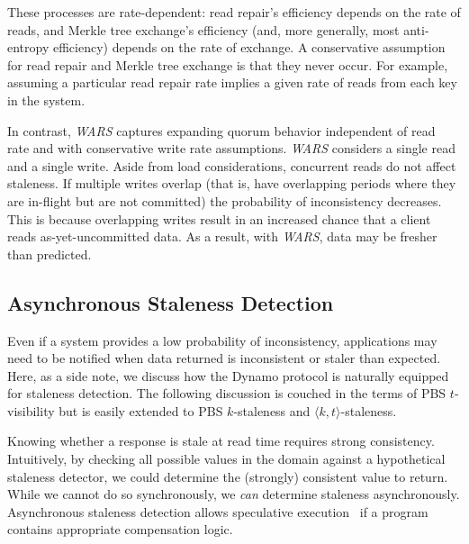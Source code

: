 \documentclass{vldb}
\newcommand{\subsectionskip}{-0em}
\begin{document}
These processes are rate-dependent: read repair's efficiency depends
on the rate of reads, and Merkle tree exchange's efficiency (and, more
generally, most anti-entropy efficiency) depends on the rate of
exchange.  A conservative assumption for read repair and Merkle tree
exchange is that they never occur. For example, assuming a particular
read repair rate implies a given rate of reads from each key in the
system.

In contrast, \textit{WARS} captures expanding quorum behavior
independent of read rate and with conservative write rate
assumptions. \textit{WARS} considers a single read and a single
write. Aside from load considerations, concurrent reads do not affect
staleness. If multiple writes overlap (that is, have overlapping
periods where they are in-flight but are not committed) the
probability of inconsistency decreases.  This is because overlapping
writes result in an increased chance that a client reads
as-yet-uncommitted data.  As a result, with \textit{WARS}, data may be
fresher than predicted.

\vspace{\subsectionskip}\subsection{Asynchronous Staleness Detection}

Even if a system provides a low probability of inconsistency,
applications may need to be notified when data returned is
inconsistent or staler than expected.  Here, as a side note, we
discuss how the Dynamo protocol is naturally equipped for staleness
detection.  The following discussion is couched in the terms of PBS
$t$-visibility but is easily extended to PBS $k$-staleness and
$\langle k, t \rangle$-staleness.

Knowing whether a response is stale at read time requires strong
consistency.  Intuitively, by checking all possible values in the domain against a
hypothetical staleness detector, we could determine the (strongly) consistent
value to return.  While we cannot do so synchronously, we \textit{can}
determine staleness asynchronously.  Asynchronous staleness detection
allows speculative execution~\cite{nsdispeculation} if a program
contains appropriate compensation logic.
\end{document}
